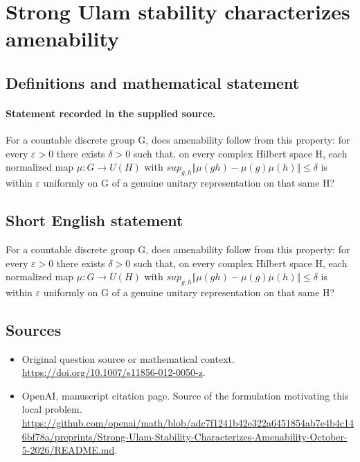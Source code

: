 \documentclass[11pt]{article}
\begin{document}
\section*{Strong Ulam stability characterizes amenability}\label{30007200}
\subsection{Definitions and mathematical statement}
\paragraph{Statement recorded in the supplied source.}
For a countable discrete group G, does amenability follow from this property: for every $\varepsilon >0$ there exists $\delta >0$ such that, on every complex Hilbert space H, each normalized map $\mu :G\to U(H)$ with $sup_{g,h}\Vert \mu (gh)-\mu (g)\mu (h)\Vert \leq \delta $ is within $\varepsilon $ uniformly on G of a genuine unitary representation on that same H?
\subsection{Short English statement}
For a countable discrete group G, does amenability follow from this property: for every $\varepsilon >0$ there exists $\delta >0$ such that, on every complex Hilbert space H, each normalized map $\mu :G\to U(H)$ with $sup_{g,h}\Vert \mu (gh)-\mu (g)\mu (h)\Vert \leq \delta $ is within $\varepsilon $ uniformly on G of a genuine unitary representation on that same H?
\subsection{Sources}
\begin{itemize}
\item[S1] Original question source or mathematical context.
\url{https://doi.org/10.1007/s11856-012-0050-z}.
\item[S2] OpenAI, manuscript citation page. Source of the formulation motivating this local problem.
\url{https://github.com/openai/math/blob/adc7f1241b42e322a6451854ab7e4b4c146bf78a/preprints/Strong-Ulam-Stability-Characterizes-Amenability-October-5-2026/README.md}.
\end{itemize}
\end{document}
